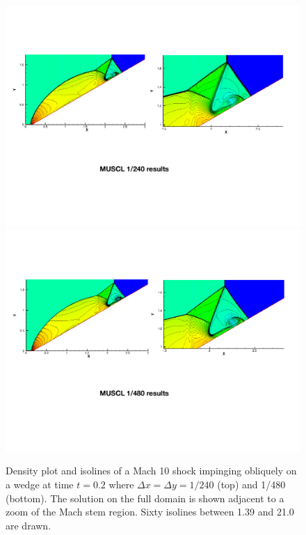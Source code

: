 \begin{figure}[h]
\centering
\hspace*{-.25in}
\includegraphics[width=1.1\linewidth]{figs/doubleMach240.pdf}
\hspace*{-.25in}
\includegraphics[width=1.1\linewidth]{figs/doubleMach480.pdf}
\caption{\sf Density plot and isolines of a Mach 10 shock impinging 
obliquely on a wedge at time $t = 0.2$ where $\Delta x = \Delta y =
1/240$ (top) and 1/480 (bottom).
The solution on the full domain is shown adjacent to a zoom of the Mach 
stem region.  Sixty isolines between 1.39 and 21.0 are drawn.}\label{fig:dm}
\end{figure}


